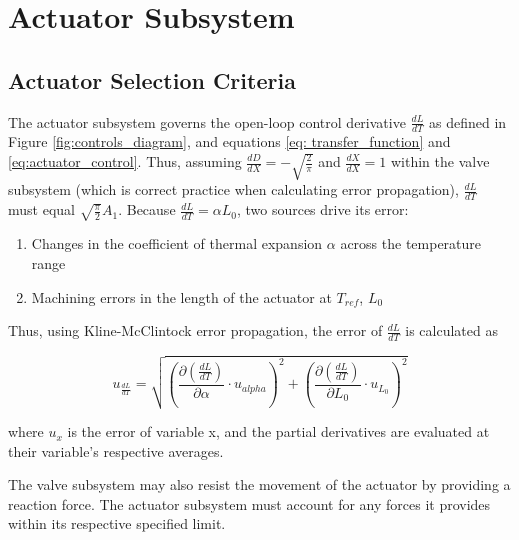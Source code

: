 \documentclass[12pt, letterpaper]{report}%
\newcounter{mycounter}           %
\newcounter{sub}[mycounter]      %
\begin{document}
            \section{Actuator Subsystem}
    \label{sec:act_sub_description}

        \subsection{Actuator Selection Criteria}
        \label{subsec:act_sel_crit}

        The actuator subsystem governs the open-loop control derivative $\frac{dL}{dT}$
        as defined in Figure \ref{fig:controls_diagram}, and equations \ref{eq: transfer_function} and \ref{eq:actuator_control}.
        Thus, assuming $\frac{dD}{dX} = -\sqrt{\frac{2}{\pi}}$ and $\frac{dX}{dX} = 1$ within the valve subsystem
        (which is correct practice when calculating error propagation),
        $\frac{dL}{dT}$ must equal $\sqrt{\frac{\pi}{2}} A_1$.
        Because
        $\frac{dL}{dT} = \alpha L_0$,
        two sources drive its error:

        \begin{enumerate}
            \item Changes in the coefficient of thermal expansion $\alpha$ across the temperature range
            \item Machining errors in the length of the actuator at $T_{ref}$, $L_0$
        \end{enumerate}

        Thus, using Kline-McClintock error propagation, the error of $\frac{dL}{dT}$ is calculated as
        
        \begin{equation}
            u_{\frac{dL}{dT}} =
            \sqrt{
                \left( \frac{\partial \left( \frac{dL}{dT} \right)}{\partial \alpha} \cdot u_{alpha} \right)^2 + 
                \left( \frac{\partial \left( \frac{dL}{dT} \right)}{\partial L_0} \cdot u_{L_0} \right)^2}
            \label{eq:udLdX}
        \end{equation}

        where $u_x$ is the error of variable x, and the partial derivatives are evaluated at their variable's respective averages. \cite{ref_Figliola}

        The valve subsystem may also resist the movement of the actuator by providing a reaction force.
        The actuator subsystem must account for any forces it provides within its respective specified limit.
\end{document}
